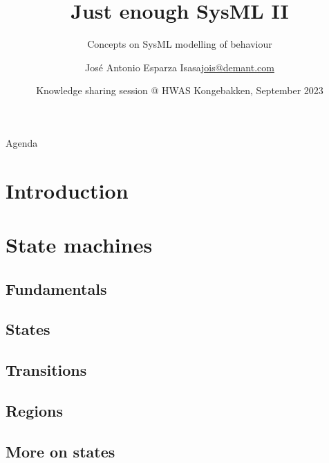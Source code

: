 \documentclass[xcolor=dvipsnames,t]{beamer}
\title {Just enough SysML II}
\subtitle {Concepts on SysML modelling of behaviour}
\author[Jose A. Esparza Isasa (jois)]{{Jos\'e Antonio Esparza Isasa}\newline\url{jois@demant.com} }
\date[] %
{Knowledge sharing session @ HWAS \newline Kongebakken, September 2023}
\begin{document}
\begin{frame} %
\vspace{1cm}
\titlepage
\begin{center}
\end{center}
\end{frame}


\begin{frame}{Agenda}
 \tableofcontents

\end{frame}


\section{Introduction}


\section{State machines}

\subsection{Fundamentals}
\subsection{States}
\subsection{Transitions}
\subsection{Regions}

\subsection{More on states}
\end{document}
